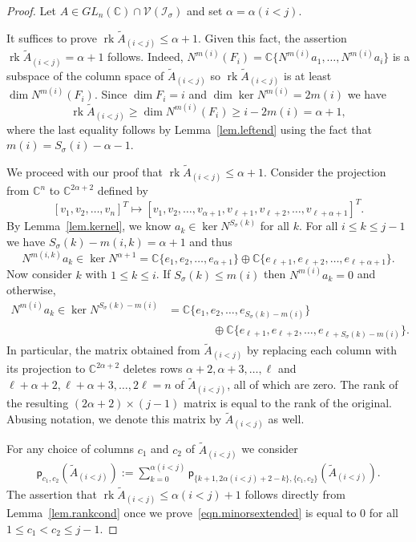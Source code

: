 \documentclass[10pt,a4paper]{amsart}
\newcommand{\C}{\mathbb{C}}           %
\newcommand{\al}{\alpha}
\newcommand{\ci}{\mathcal{I}}
\newcommand{\cv}{\mathcal{V}}
\newcommand{\gs}{\sigma}
\renewcommand{\ker}{\operatorname{ker }}
\newcommand{\m}[2]{m(#1,#2)}
\newcommand{\mi}[1]{m(#1)}
\newcommand{\pl}{\mathsf{p}}
\newcommand{\rk}{\operatorname{rk}}
\begin{document}
\begin{proof} Let $A\in GL_n(\C)\cap\cv(\ci_\gs)$ and set $\al=\al(i<j)$. 

It suffices to prove $\rk \widetilde A_{(i<j)} \leq \al+1$. Given this fact, the assertion $\rk \widetilde A_{(i<j)} = \al+1$ follows. Indeed, $N^{\mi{i}}\left( F_i \right) = \C\{ N^{\mi{i}}a_1, \ldots,N^{\mi{i}}a_i \}$ is a subspace of the column space of $\widetilde A_{(i<j)}$ so $\rk \widetilde A_{(i<j)}$ is at least $\dim N^{\mi{i}}\left( F_i \right)$. Since $\dim F_i = i$ and $\dim \ker N^{\mi{i}} = 2\mi{i}$ we have 
\[
\rk \widetilde A_{(i<j)}  \geq \dim N^{\mi{i}}\left( F_i \right) \geq i - 2\mi{i} = \al +1,
\]
where the last equality follows by Lemma~\ref{lem.leftend} using the fact that $\mi{i}=S_\gs(i)-\al-1$. 

We proceed with our proof that $\rk  \widetilde A_{(i<j)} \leq \al+1$. Consider the projection from $\C^n$ to $\C^{2\al+2}$ defined by
\[
\left[ v_1, v_2, \ldots, v_n\right]^T \mapsto \left[v_1,v_2, \ldots, v_{\al+1}, v_{\ell+1}, v_{\ell+2}, \ldots, v_{\ell+\al+1}\right]^T.
\]
By Lemma~\ref{lem.kernel}, we know $a_k\in \ker N^{S_\gs(k)}$ for all $k$. For all $i\leq k \leq j-1$ we have $S_\gs(k) - \m{i}{k} = \al+1$ and thus
\[
N^{\m{i}{k}} a_k \in \ker N^{\al +1} = \C\{e_1, e_2, \ldots, e_{\al+1}\} \oplus \C\{ e_{\ell+1}, e_{\ell+2}, \ldots, e_{\ell+\al+1}\}.
\]
Now consider $k$ with $1\leq k \leq i$. If $S_\gs(k)\leq \mi{i}$ then $N^{\mi{i}}a_k = 0$ and otherwise,
\begin{align}\label{eqn.Nm(i)}
N^{\mi{i}} a_k \in \ker N^{S_\gs(k)-\mi{i}} &= \C\{e_1, e_2, \ldots, e_{S_\gs(k)-\mi{i}}\} \\ \nonumber
& \qquad \qquad \oplus \C\{e_{\ell+1}, e_{\ell+2}, \ldots, e_{\ell + S_\gs(k)-\mi{i}}\}.
\end{align}
In particular, the matrix obtained from $\widetilde A_{(i<j)}$ by replacing each column with its projection to $\C^{2\al+2}$ deletes rows $\al+2, \al+3, \ldots, \ell$ and $\ell+\al+2, \ell+\al+3, \ldots, 2\ell =n$ of $\widetilde A_{(i<j)}$, all of which are zero.  The rank of the resulting $(2\al+2)\times (j-1)$ matrix is equal to the rank of the original. Abusing notation, we denote this matrix by $\widetilde A_{(i<j)}$ as well. 


For any choice of columns $c_1$ and $c_2$ of $\widetilde A_{(i<j)}$ we consider
\begin{eqnarray}\label{eqn.minorsextended}
\pl_{c_1,c_2}\left(\widetilde A_{(i<j)}\right) := \sum_{k=0}^{\al(i<j)}\pl_{\{k+1, 2\al(i<j)+2-k\}, \{c_1,c_2\}} \left(\widetilde A_{(i<j)}\right) .
\end{eqnarray}
The assertion that $\rk \widetilde A_{(i<j)} \leq \al(i<j)+1$ follows directly from Lemma~\ref{lem.rankcond} once we prove~\eqref{eqn.minorsextended} is equal to $0$ for all $1\leq c_1<c_2\leq j-1$. 


\end{proof}
\end{document}
